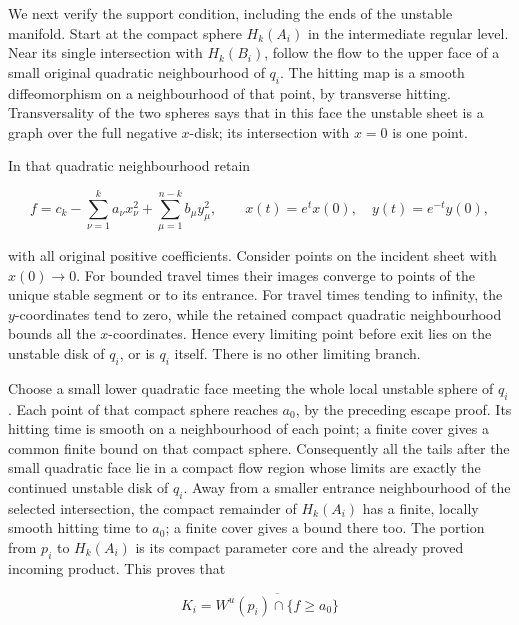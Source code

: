 We next verify the support condition, including the ends of the unstable manifold. Start at the compact sphere \(H_k(A_i)\) in the intermediate regular level. Near its single intersection with \(H_k(B_i)\), follow the flow to the upper face of a small original quadratic neighbourhood of \(q_i\). The hitting map is a smooth diffeomorphism on a neighbourhood of that point, by transverse hitting. Transversality of the two spheres says that in this face the unstable sheet is a graph over the full negative \(x\)-disk; its intersection with \(x=0\) is one point.

In that quadratic neighbourhood retain

\begin{equation}
f=c_k-\sum_{\nu=1}^k a_\nu x_\nu^2+
                    \sum_{\mu=1}^{n-k}b_\mu y_\mu^2,
 \qquad
 x(t)=e^t x(0),\quad y(t)=e^{-t}y(0),
 \label{courseIII:realizing-framed-handles-and-middle-cancellation:eq:5.2}
\end{equation}

with all original positive coefficients. Consider points on the incident sheet with \(x(0)\to0\). For bounded travel times their images converge to points of the unique stable segment or to its entrance. For travel times tending to infinity, the \(y\)-coordinates tend to zero, while the retained compact quadratic neighbourhood bounds all the \(x\)-coordinates. Hence every limiting point before exit lies on the unstable disk of \(q_i\), or is \(q_i\) itself. There is no other limiting branch.

Choose a small lower quadratic face meeting the whole local unstable sphere of \(q_i\). Each point of that compact sphere reaches \(a_0\), by the preceding escape proof. Its hitting time is smooth on a neighbourhood of each point; a finite cover gives a common finite bound on that compact sphere. Consequently all the tails after the small quadratic face lie in a compact flow region whose limits are exactly the continued unstable disk of \(q_i\). Away from a smaller entrance neighbourhood of the selected intersection, the compact remainder of \(H_k(A_i)\) has a finite, locally smooth hitting time to \(a_0\); a finite cover gives a bound there too. The portion from \(p_i\) to \(H_k(A_i)\) is its compact parameter core and the already proved incoming product. This proves that

\begin{equation}
K_i=\overline{W^u(p_i)\cap\{f\geq a_0\}}
 \label{courseIII:realizing-framed-handles-and-middle-cancellation:eq:5.3}
\end{equation}

